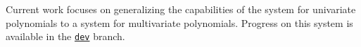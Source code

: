 \label{sec:multivariate}

Current work focuses on generalizing the capabilities of the system for univariate polynomials to a system for multivariate polynomials. Progress on this system is available in the \href{https://github.com/LiamSchilling/AutomatePolynomial/tree/dev}{\texttt{dev}} branch.

\newpage

